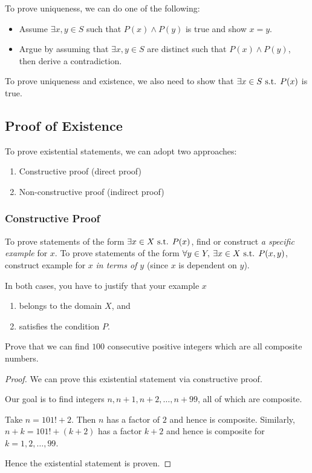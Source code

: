 To prove uniqueness, we can do one of the following:
\begin{itemize}
\item Assume $\exists x,y \in S$ such that $P(x) \land P(y)$ is true and show $x=y$.
\item Argue by assuming that $\exists x,y \in S$ are distinct such that $P(x) \land P(y)$, then derive a contradiction.
\end{itemize}
To prove uniqueness and existence, we also need to show that $\exists x \in S \text{ s.t. } P(x)$ is true.

\subsection{Proof of Existence}
To prove existential statements, we can adopt two approaches:
\begin{enumerate}
\item Constructive proof (direct proof)
\item Non-constructive proof (indirect proof)
\end{enumerate}

\subsubsection{Constructive Proof}
To prove statements of the form $\exists x\in X \text{ s.t. } P(x)$, find or construct \emph{a specific example} for $x$. To prove statements of the form $\forall y\in Y,\:\exists x\in X\text{ s.t. } P(x,y)$, construct example for $x$ \emph{in terms of $y$} (since $x$ is dependent on $y$).

In both cases, you have to justify that your example $x$
\begin{enumerate}
\item belongs to the domain $X$, and
\item satisfies the condition $P$.
\end{enumerate}

\begin{exercise}{}{}
Prove that we can find $100$ consecutive positive integers which are all composite numbers.
\end{exercise}

\begin{proof}
We can prove this existential statement via constructive proof.

Our goal is to find integers $n,n+1,n+2,\dots,n+99$, all of which are composite.

Take $n=101!+2$. Then $n$ has a factor of $2$ and hence is composite. Similarly, $n+k=101!+(k+2)$ has a factor $k+2$ and hence is composite for $k=1,2,\dots,99$.

Hence the existential statement is proven.
\end{proof}

